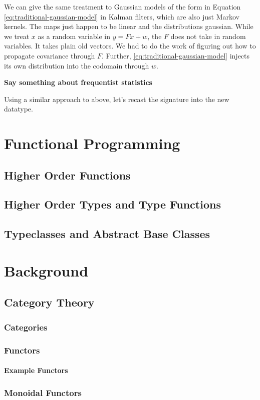 We can give the same treatment to Gaussian models of the form in Equation \ref{eq:traditional-gaussian-model} in Kalman filters, which are also just Markov kernels. The maps just happen to be linear and the distributions gaussian.
While we treat $x$ as a random variable in $y = Fx + w$, the $F$ does not take in random variables.
It takes plain old vectors.
We had to do the work of figuring out how to propagate covariance through $F$.
Further, \ref{eq:traditional-gaussian-model} injects its own distribution into the codomain through $w$.

\textbf{Say something about frequentist statistics}

Using a similar approach to above, let's recast the signature into the new datatype.

\chapter{Functional Programming}
\section{Higher Order Functions}
\section{Higher Order Types and Type Functions}
\section{Typeclasses and Abstract Base Classes}

\chapter{Background}
\section{Category Theory}
\subsection{Categories}
\subsection{Functors}
\subsubsection{Example Functors}
\subsection{Monoidal Functors}
